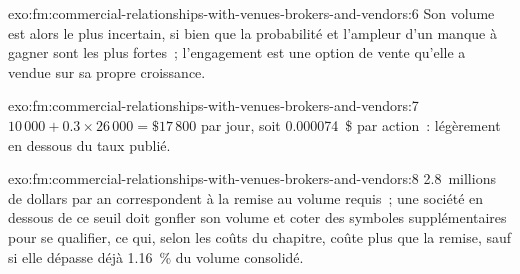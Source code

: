 \begin{solution}{exo:fm:commercial-relationships-with-venues-brokers-and-vendors:6}
Son volume est alors le plus incertain, si bien que la probabilité et l'ampleur d'un manque à gagner sont les plus fortes~; l'engagement est une option de vente qu'elle a vendue sur sa propre croissance.
\end{solution}

\begin{solution}{exo:fm:commercial-relationships-with-venues-brokers-and-vendors:7}
$10\,000+0.3\times26\,000=\$17\,800$ par jour, soit 0.000074~\$ par action~: légèrement en dessous du taux publié.
\end{solution}

\begin{solution}{exo:fm:commercial-relationships-with-venues-brokers-and-vendors:8}
2.8~millions de dollars par an correspondent à la remise au volume requis~; une société en dessous de ce seuil doit gonfler son volume et coter des symboles supplémentaires pour se qualifier, ce qui, selon les
coûts du chapitre, coûte plus que la remise, sauf si elle dépasse déjà 1.16~\% du volume consolidé.
\end{solution}

